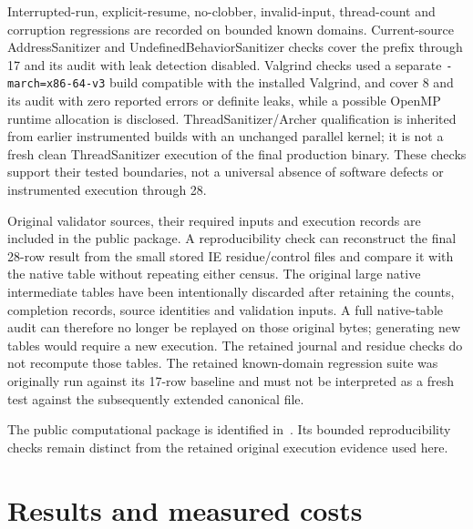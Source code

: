 \documentclass[11pt]{article}
\theoremstyle{definition}
\theoremstyle{remark}
\begin{document}
Interrupted-run, explicit-resume, no-clobber, invalid-input, thread-count
and corruption regressions are recorded on bounded known domains.
Current-source AddressSanitizer and UndefinedBehaviorSanitizer checks cover
the prefix through 17 and its audit with leak detection disabled.
Valgrind checks used a separate \texttt{-march=x86-64-v3} build compatible
with the installed Valgrind, and cover 8 and its audit with zero reported
errors or definite leaks, while a possible OpenMP runtime allocation is
disclosed. ThreadSanitizer/Archer qualification is inherited from earlier
instrumented builds with an unchanged parallel kernel; it is not a fresh
clean ThreadSanitizer execution of the final production binary.
These checks support their tested boundaries, not a universal absence of
software defects or instrumented execution through 28.

Original validator sources, their required inputs and execution records
are included in the public package. A reproducibility check can reconstruct the final
28-row result from the small stored IE residue/control files and compare
it with the native table without repeating either census. The original
large native intermediate tables have been intentionally discarded after
retaining the counts, completion records, source identities and validation
inputs. A full native-table audit can therefore no longer be replayed on
those original bytes; generating new tables would require a new execution.
The retained journal and residue checks do not recompute those tables.
The retained known-domain regression suite was originally run against its
17-row baseline and must not be interpreted as a fresh test against the
subsequently extended canonical file.

The public computational package is identified in~\cite{corti}.
Its bounded reproducibility checks remain distinct from the retained
original execution evidence used here.

\section{Results and measured costs}
\label{sec:results}
\end{document}
